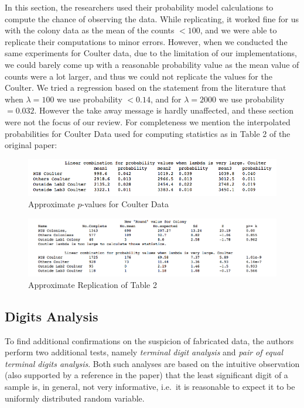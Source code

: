\documentclass{article}
\begin{document}
In this section, the researchers used their probability model calculations to compute the chance of observing the data. While replicating,
it worked fine for us with the colony data as the mean of the counts $<100$, and we were able to replicate their computations to minor errors. However, when we conducted the same experiments for Coulter data, due to the limitation of our implementations, we could barely come up with a reasonable probability value as the mean value of counts were a lot larger, and thus we could not replicate the values for the Coulter. We tried a regression based on the statement from the
literature that when $\lambda = 100$ we use probability $<0.14$, and for $\lambda = 2000$ we use probability $= 0.032$. However the take away message is hardly unaffected, and these section were not the focus of our review. For completeness we mention the interpolated probabilities for Coulter Data used for computing statistics as in Table 2 of the original paper:

\begin{figure}[H]
\centering
\includegraphics[width=0.9\linewidth]{images/Lambda_Coulter.png}
\caption{Approximate $p$-values for Coulter Data}
\end{figure}

\begin{figure}[H]
\centering
\includegraphics[width=0.9\linewidth]{images/HT_Stat_values.png}
\caption{Approximate Replication of Table 2}
\end{figure}

    \subsection{Digits Analysis}\label{digits-analysis}

To find additional confirmations on the suspicion of fabricated data, the
authors perform two additional tests, namely \textit{terminal
digit analysis} and \textit{pair of equal terminal digits analysis}. Both
such analyses are based on the intuitive observation (also supported by a reference in the paper) that the least significant digit of a sample is, in general, not very informative, i.e.~it is reasonable to expect it to be uniformly distributed random variable.
\end{document}
